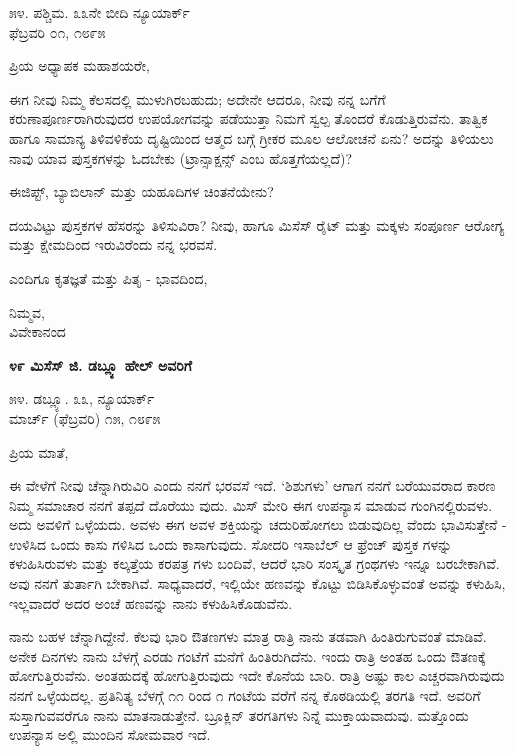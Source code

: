 \begin{flushright}
೫೪. ಪಶ್ಚಿಮ. ೩೩ನೇ ಬೀದಿ ನ್ಯೂಯಾರ್ಕ್\\ಫೆಬ್ರವರಿ ೦೧, ೧೮೯೫
\end{flushright}

ಪ್ರಿಯ ಅಧ್ಯಾಪಕ ಮಹಾಶಯರೇ,

ಈಗ ನೀವು ನಿಮ್ಮ ಕೆಲಸದಲ್ಲಿ ಮುಳುಗಿರಬಹುದು; ಅದೇನೇ ಆದರೂ, ನೀವು ನನ್ನ ಬಗೆಗೆ ಕರುಣಾಪೂರ್ಣರಾಗಿರುವುದರ ಉಪಯೋಗವನ್ನು ಪಡೆಯುತ್ತಾ ನಿಮಗೆ ಸ್ವಲ್ಪ ತೊಂದರೆ ಕೊಡುತ್ತಿರುವೆನು. ತಾತ್ವಿಕ ಹಾಗೂ ಸಾಮಾನ್ಯ ತಿಳಿವಳಿಕೆಯ ದೃಷ್ಟಿಯಿಂದ ಆತ್ಮದ ಬಗ್ಗೆ ಗ್ರೀಕರ ಮೂಲ ಆಲೋಚನೆ ಏನು? ಅದನ್ನು ತಿಳಿಯಲು ನಾವು ಯಾವ ಪುಸ್ತಕಗಳನ್ನು ಓದಬೇಕು (ಟ್ರಾನ್ಸಾಕ್ಷನ್ಸ್ ಎಂಬ ಹೊತ್ತಗೆಯಲ್ಲದೆ)?

ಈಜಿಪ್ಟ್, ಬ್ಯಾಬಿಲಾನ್ ಮತ್ತು ಯಹೂದಿಗಳ ಚಿಂತನೆಯೇನು?

ದಯವಿಟ್ಟು ಪುಸ್ತಕಗಳ ಹೆಸರನ್ನು ತಿಳಿಸುವಿರಾ? ನೀವು, ಹಾಗೂ ಮಿಸೆಸ್ ರೈಟ್ ಮತ್ತು ಮಕ್ಕಳು ಸಂಪೂರ್ಣ ಆರೋಗ್ಯ ಮತ್ತು ಕ್ಷೇಮದಿಂದ ಇರುವಿರೆಂದು ನನ್ನ ಭರವಸೆ.

ಎಂದಿಗೂ ಕೃತಜ್ಞತೆ ಮತ್ತು ಪಿತೃ - ಭಾವದಿಂದ,

\begin{flushright}
ನಿಮ್ಮವ,\\ವಿವೇಕಾನಂದ
\end{flushright}

\begin{center}
\textbf{೪೯ ಮಿಸೆಸ್ ಜಿ. ಡಬ್ಲ್ಯೂ ಹೇಲ್ ಅವರಿಗೆ}
\end{center}

\begin{flushright}
೫೪. ಡಬ್ಲ್ಯೂ. ೩೩, ನ್ಯೂಯಾರ್ಕ್\\ಮಾರ್ಚ್ (ಫೆಬ್ರವರಿ) ೧೫, ೧೮೯೫
\end{flushright}

ಪ್ರಿಯ ಮಾತೆ,

ಈ ವೇಳೆಗೆ ನೀವು ಚೆನ್ನಾಗಿರುವಿರಿ ಎಂದು ನನಗೆ ಭರವಸೆ ಇದೆ. ‘ಶಿಶುಗಳು’ ಆಗಾಗ ನನಗೆ ಬರೆಯುವರಾದ ಕಾರಣ ನಿಮ್ಮ ಸಮಾಚಾರ ನನಗೆ ತಪ್ಪದೆ ದೊರೆಯು ವುದು. ಮಿಸ್ ಮೇರಿ ಈಗ ಉಪನ್ಯಾಸ ಮಾಡುವ ಗುಂಗಿನಲ್ಲಿರುವಳು. ಅದು ಅವಳಿಗೆ ಒಳ್ಳೆಯದು. ಅವಳು ಈಗ ಅವಳ ಶಕ್ತಿಯನ್ನು ಚದುರಿಹೋಗಲು ಬಿಡುವುದಿಲ್ಲ ವೆಂದು ಭಾವಿಸುತ್ತೇನೆ - ಉಳಿಸಿದ ಒಂದು ಕಾಸು ಗಳಿಸಿದ ಒಂದು ಕಾಸಾಗುವುದು. ಸೋದರಿ ಇಸಾಬೆಲ್ ಆ ಫ್ರೆಂಚ್ ಪುಸ್ತಕ ಗಳನ್ನು ಕಳುಹಿಸಿರುವಳು ಮತ್ತು ಕಲ್ಕತ್ತೆಯ ಕರಪತ್ರ ಗಳು ಬಂದಿವೆ, ಆದರೆ ಭಾರಿ ಸಂಸ್ಕೃತ ಗ್ರಂಥಗಳು ಇನ್ನೂ ಬರಬೇಕಾಗಿವೆ. ಅವು ನನಗೆ ತುರ್ತಾಗಿ ಬೇಕಾಗಿವೆ. ಸಾಧ್ಯವಾದರೆ, ಇಲ್ಲಿಯೇ ಹಣವನ್ನು ಕೊಟ್ಟು ಬಿಡಿಸಿಕೊಳ್ಳುವಂತೆ ಅವನ್ನು ಕಳುಹಿಸಿ, ಇಲ್ಲವಾದರೆ ಅದರ ಅಂಚೆ ಹಣವನ್ನು ನಾನು ಕಳುಹಿಸಿಕೊಡುವೆನು.

ನಾನು ಬಹಳ ಚೆನ್ನಾಗಿದ್ದೇನೆ. ಕೆಲವು ಭಾರಿ ಔತಣಗಳು ಮಾತ್ರ ರಾತ್ರಿ ನಾನು ತಡವಾಗಿ ಹಿಂತಿರುಗುವಂತೆ ಮಾಡಿವೆ. ಅನೇಕ ದಿನಗಳು ನಾನು ಬೆಳಗ್ಗೆ ಎರಡು ಗಂಟೆಗೆ ಮನೆಗೆ ಹಿಂತಿರುಗಿದೆನು. ಇಂದು ರಾತ್ರಿ ಅಂತಹ ಒಂದು ಔತಣಕ್ಕೆ ಹೋಗುತ್ತಿರುವೆನು. ಅಂತಹುದಕ್ಕೆ ಹೋಗುತ್ತಿರುವುದು ಇದೇ ಕೊನೆಯ ಬಾರಿ. ರಾತ್ರಿ ಅಷ್ಟು ಕಾಲ ಎಚ್ಚರವಾಗಿರುವುದು ನನಗೆ ಒಳ್ಳೆಯದಲ್ಲ. ಪ್ರತಿನಿತ್ಯ ಬೆಳಗ್ಗೆ ೧೧ ರಿಂದ ೧ ಗಂಟೆಯ ವರೆಗೆ ನನ್ನ ಕೊಠಡಿಯಲ್ಲಿ ತರಗತಿ ಇದೆ. ಅವರಿಗೆ ಸುಸ್ತಾಗುವವರೆಗೂ ನಾನು ಮಾತನಾಡುತ್ತೇನೆ. ಬ್ರೂಕ್ಲಿನ್ ತರಗತಿಗಳು ನಿನ್ನೆ ಮುಕ್ತಾಯವಾದುವು. ಮತ್ತೊಂದು ಉಪನ್ಯಾಸ ಅಲ್ಲಿ ಮುಂದಿನ ಸೋಮವಾರ ಇದೆ.

